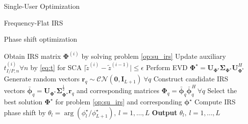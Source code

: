 \documentclass{IEEEtran}
\begin{document}
\begin{section}{Single-User Optimization}
\begin{subsection}{Frequency-Flat IRS}
\begin{subsubsection}{Phase shift optimization}
\begin{algorithm}
\begin{algorithmic}[1]
					\State Obtain IRS matrix $\boldsymbol{\Phi}^{(i)}$ by solving problem \ref{op:su_irs}
					\State Update auxiliary $t_{I/P,n}^{(i)} \forall n$ by \ref{eq:t} for SCA
					\Until $\lvert \tilde{z}^{(i)}-\tilde{z}^{(i-1)} \rvert \le \epsilon$
					\State Perform EVD $\boldsymbol{\Phi}^{\star}=\boldsymbol{U}_{\boldsymbol{\Phi}^{\star}}\boldsymbol{\Sigma}_{\boldsymbol{\Phi}^{\star}}\boldsymbol{U}_{\boldsymbol{\Phi}^{\star}}^H$
					\State Generate random vectors $\boldsymbol{r}_q \sim \mathcal{CN}(\boldsymbol{0},\boldsymbol{I}_{L+1}) \ \forall q$
					\State Construct candidate IRS vectors $\bar{\boldsymbol{\phi}}_q=\boldsymbol{U}_{\boldsymbol{\Phi}^{\star}}\boldsymbol{\Sigma}_{\boldsymbol{\Phi}^{\star}}^{\frac{1}{2}}\boldsymbol{r}_q$ and corresponding matrices $\boldsymbol{\Phi}_q=\bar{\boldsymbol{\phi}}_q\bar{\boldsymbol{\phi}}_q^H  \ \forall q$
					\State Select the best solution $\boldsymbol{\Phi}^\star$ for problem \ref{op:su_irs} and corresponding $\boldsymbol{\phi}^\star$
					\State Compute IRS phase shift by $\theta_l=\arg(\phi_l^\star/\phi_{L+1}^\star), \ l=1,\dots,L$
					\State \textbf{Output} $\theta_l, \ l=1,\dots,L$
				\end{algorithmic}
			\end{algorithm}
		\end{subsubsection}


\end{subsection}
\end{section}
\end{document}
